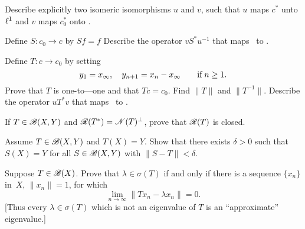 \begin{enumerate}
\begin{excopy}
\begin{itemize}
Describe explicitly two isomeric isomorphisms $u$ and $v$,
 such that $u$ maps \(c^*\) unto \(\ell^1\)
and $v$ maps \(c_0^*\) onto \ellone.

Define \(S: c_0 \to c\) by \(Sf = f\) Describe the operator
\(vS^*u^{-1}\) that maps \ellone\ to \ellone.

Define \(T: c \to c_0\) by setting
\begin{equation*}
 y_1 = x_\infty,\quad y_{n+1} = x_n - x_\infty \qquad \textnormal{if}\; n \geq 1.
\end{equation*}
Prove that $T$ is one-to—one and that \(Tc = c_0\).
 Find \(\|T\|\) and \(\|T^{-1}\|\). Describe the
operator \(uT^*v\) that maps \ellone\ to \ellone.
\end{itemize}
\end{excopy}

\begin{itemize}




\end{itemize}


\unfinished

\begin{excopy}
If \(T \in \mathscr{B}(X,Y)\) and \(\mathscr{R}(T^*) = \mathscr{N}(T)^\perp\),
prove that \(\mathscr{R}(T)\) is closed.
\end{excopy}

\unfinished

\begin{excopy}
Assume \(T \in \mathscr{B}(X,Y)\) and \(T(X)=Y\). Show that there exists \(\delta>0\)
such that \(S(X)=Y\) for all \(S\in\mathscr{B}(X,Y)\) with \(\|S-T\|<\delta\).
\end{excopy}

\begin{excopy}
Suppose \(T \in \mathscr{B}(X)\). Prove that \(\lambda \in \sigma(T)\) if and only if
there is a sequence \(\{x_n\}\) in~$X$, \(\|x_n\|=1\), for which 
\begin{equation*}
\lim_{n\to\infty} \|T x_n - \lambda x_n\| = 0.
\end{equation*}
[Thus every \(\lambda \in \sigma(T)\) which is not an eigenvalue of $T$
is an ``approximate'' eigenvalue.]
\end{excopy}

\unfinished

\end{enumerate}



